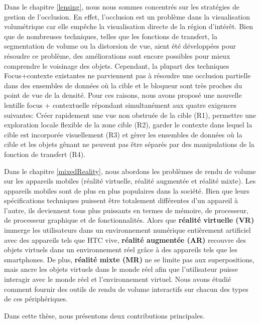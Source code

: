 Dans le chapitre \ref{lensing}, nous nous sommes concentrés sur les stratégies de gestion de l'occlusion. En effet, l'occlusion est un problème dans la visualisation volumétrique car elle empêche la visualisation directe de la région d'intérêt. Bien que de nombreuses techniques, telles que les fonctions de transfert, la segmentation de volume ou la distorsion de vue, aient été développées pour résoudre ce problème, des améliorations sont encore possibles pour mieux comprendre le voisinage des objets. Cependant, la plupart des techniques Focus+contexte existantes ne parviennent pas à résoudre une occlusion partielle dans des ensembles de données où la cible et le bloqueur sont très proches du point de vue de la densité. Pour ces raisons, nous avons proposé une nouvelle lentille focus + contextuelle répondant simultanément aux quatre exigences suivantes: Créer rapidement une vue non obstruée de la cible (R1), permettre une exploration locale flexible de la zone cible (R2), garder le contexte dans lequel la cible est incorporée visuellement (R3) et gèrer les ensembles de données où la cible et les objets gênant ne peuvent pas être séparés par des manipulations de la fonction de transfert (R4).



Dans le chapitre \ref{mixedReality}, nous abordons les problèmes de rendu de volume sur les appareils mobiles (réalité virtuelle, réalité augmentée et réalité mixte). Les appareils mobiles sont de plus en plus populaires dans la société. Bien que leurs spécifications techniques puissent être totalement différentes d’un appareil à l’autre, ils deviennent tous plus puissants en termes de mémoire, de processeur, de processeur graphique et de fonctionnalités. Alors que \textbf{réalité virtuelle (VR)} immerge les utilisateurs dans un environnement numérique entièrement artificiel avec des appareils tels que HTC vive, \textbf{réalité augmentée (AR)} recouvre des objets virtuels dans un environnement réel grâce à des appareils tels que les smartphones. De plus, \textbf {réalité mixte (MR)} ne se limite pas aux superpositions, mais ancre les objets virtuels dans le monde réel afin que l'utilisateur puisse interagir avec le monde réel et l'environnement virtuel. Nous avons étudié comment fournir des outils de rendu de volume interactifs sur chacun des types de ces périphériques.


Dans cette thèse, nous présentons deux contributions principales.


